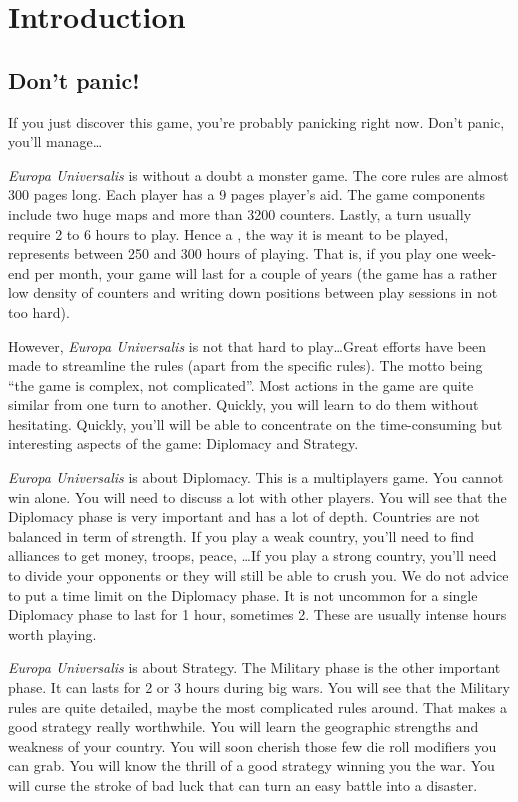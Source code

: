 
\chapter*{Introduction}

\section*{Don't panic!}
If you just discover this game, you're probably panicking right now. Don't
panic, you'll manage\ldots

\emph{Europa Universalis} is without a doubt a monster game. The core rules
are almost 300 pages long. Each player has a 9 pages player's aid. The game
components include two huge maps and more than 3200 counters. Lastly, a turn
usually require 2 to 6 hours to play. Hence a , the way
it is meant to be played, represents between 250 and 300 hours of
playing. That is, if you play one week-end per month, your game will last for
a couple of years (the game has a rather low density of counters and writing
down positions between play sessions in not too hard).

However, \emph{Europa Universalis} is not that hard to play\ldots Great
efforts have been made to streamline the rules (apart from the specific
rules). The motto being ``the game is complex, not complicated''. Most actions
in the game are quite similar from one turn to another. Quickly, you will learn
to do them without hesitating. Quickly, you'll will be able to concentrate on
the time-consuming but interesting aspects of the game: Diplomacy and
Strategy.

\emph{Europa Universalis} is about Diplomacy. This is a multiplayers game. You
cannot win alone. You will need to discuss a lot with other players. You will
see that the Diplomacy phase is very important and has a lot of
depth. Countries are not balanced in term of strength. If you play a weak
country, you'll need to find alliances to get money, troops, peace, \ldots If
you play a strong country, you'll need to divide your opponents or they will
still be able to crush you. We do not advice to put a time limit on the
Diplomacy phase. It is not uncommon for a single Diplomacy phase to last for 1
hour, sometimes 2. These are usually intense hours worth playing.

\emph{Europa Universalis} is about Strategy. The Military phase is the other
important phase. It can lasts for 2 or 3 hours during big wars. You will see
that the Military rules are quite detailed, maybe the most complicated rules
around. That makes a good strategy really worthwhile. You will learn the
geographic strengths and weakness of your country. You will soon cherish those
few  die roll modifiers you can grab. You will know the thrill of a
good strategy winning you the war. You will curse the stroke of bad luck that
can turn an easy battle into a disaster.

